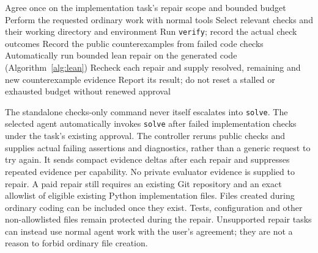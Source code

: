 \documentclass[10pt,twocolumn,a4paper]{article}
\begin{document}
\begin{algorithm}[t]
\small
\caption{Normal-agent testing-stage policy}
\label{alg:normal-agent}
Agree once on the implementation task's repair scope and bounded budget\;
Perform the requested ordinary work with normal tools\;
Select relevant checks and their working directory and environment\;
Run \texttt{verify}; record the actual check outcomes\;
Record the public counterexamples from failed code checks\;
Automatically run bounded lean repair on the generated code (Algorithm~\ref{alg:lean})\;
Recheck each repair and supply resolved, remaining and new counterexample evidence\;
Report its result; do not reset a stalled or exhausted budget without renewed approval\;
\end{algorithm}

The standalone checks-only command never itself escalates into \texttt{solve}.
The selected agent automatically invokes \texttt{solve} after failed
implementation checks under the task's existing approval. The controller reruns
public checks and supplies actual failing assertions and diagnostics, rather
than a generic request to try again. It sends compact evidence deltas after
each repair and suppresses repeated evidence per capability. No private
evaluator evidence is supplied to repair.
A paid repair still requires an existing Git repository and an exact allowlist
of eligible existing Python implementation files.
Files created during ordinary coding can be included once they exist.
Tests, configuration and other non-allowlisted files remain protected during
the repair. Unsupported repair tasks can instead use normal agent work with
the user's agreement; they are not a reason to forbid ordinary file creation.
\end{document}
